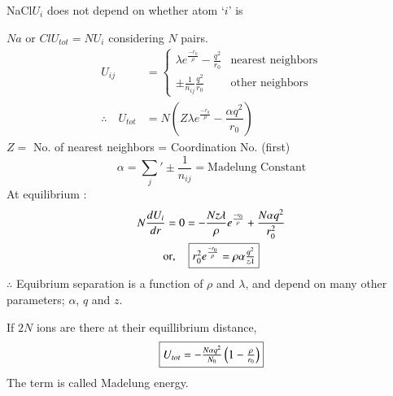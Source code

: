 \begin{example*}
NaCl\quad $U_{i}$ does not depend on whether atom `$i$' is

$Na$ or $Cl$\quad $U_{tot}=NU_{i}$ considering $N$ pairs.
\begin{align*}
U_{ij} &=
\left\{
\begin{array}{ll}
\lambda e^{\frac{-r_{0}}\rho}-\frac{q^{2}}{r_{0}} & \text{nearest neighbors}\\
\pm \frac{1}{n_{ij}}\frac{q^{2}}{r_{0}} & \text{other neighbors}
\end{array}
\right.\\
\therefore\quad U_{tot} &= N\left(Z\lambda e^{\frac{-r_{0}}{\rho}}-\dfrac{\alpha q^{2}}{r_{0}}\right)
\end{align*}
$Z=$ No. of nearest neighbors = Coordination No. (first)
$$
\alpha={\sum\limits_{j}}'\pm \frac{1}{n_{ij}}=\text{Madelung Constant}
$$
At equilibrium :
\begin{gather*}
N\dfrac{dU_{i}}{dr}=0=-\dfrac{Nz\lambda}{\rho}e^{\frac{-r_{0}}{\rho}}+\dfrac{N\alpha q^{2}}{r_{0}^{2}}\\
\text{or},\quad \fbox{$r^{2}_{0}e^{\frac{-r_{0}}{\rho}}=\rho\alpha \frac{q^{2}}{z\lambda}$}
\end{gather*}
$\therefore$ Equibrium separation is a function of $\rho$ and $\lambda$, and depend on many other parameters; $\alpha$, $q$ and $z$.

If $2N$ ions are there at their equillibrium distance,
$$
\fbox{$U_{tot}=-\frac{N\alpha q^{2}}{N_{0}}\left(1-\frac{\rho}{r_{0}}\right)$}
$$
The term  is called Madelung energy.
\end{example*}


